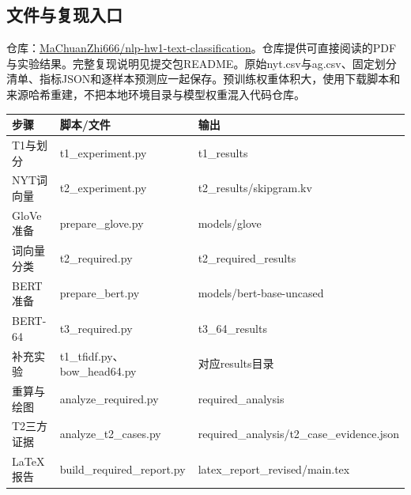 \documentclass[UTF8,a4paper,11pt,fontset=fandol]{ctexart}
\begin{document}
\subsection{文件与复现入口}
仓库：\href{https://github.com/MaChuanZhi666/nlp-hw1-text-classification}{MaChuanZhi666/\allowbreak{}nlp-hw1-text-classification}。仓库提供可直接阅读的PDF与实验结果。完整复现说明见提交包README。原始nyt.\allowbreak{}csv与ag.\allowbreak{}csv、固定划分清单、指标JSON和逐样本预测应一起保存。预训练权重体积大，使用下载脚本和来源哈希重建，不把本地环境目录与模型权重混入代码仓库。

\begin{center}\begin{minipage}{\linewidth}\small
\setlength{\tabcolsep}{4pt}
\renewcommand{\arraystretch}{1.22}
\begin{tabular}{>{\raggedright\arraybackslash}p{}>{\raggedright\arraybackslash}p{}>{\raggedright\arraybackslash}p{}}
\toprule
\textbf{步骤} & \textbf{脚本/\allowbreak{}文件} & \textbf{输出} \\
\midrule
T1与划分 & t1\_\allowbreak{}experiment.\allowbreak{}py & t1\_\allowbreak{}results \\
NYT词向量 & t2\_\allowbreak{}experiment.\allowbreak{}py & t2\_\allowbreak{}results/\allowbreak{}skipgram.\allowbreak{}kv \\
GloVe准备 & prepare\_\allowbreak{}glove.\allowbreak{}py & models/\allowbreak{}glove \\
词向量分类 & t2\_\allowbreak{}required.\allowbreak{}py & t2\_\allowbreak{}required\_\allowbreak{}results \\
BERT准备 & prepare\_\allowbreak{}bert.\allowbreak{}py & models/\allowbreak{}bert-base-uncased \\
BERT-64 & t3\_\allowbreak{}required.\allowbreak{}py & t3\_\allowbreak{}64\_\allowbreak{}results \\
补充实验 & t1\_\allowbreak{}tfidf.\allowbreak{}py、bow\_\allowbreak{}head64.\allowbreak{}py & 对应results目录 \\
重算与绘图 & analyze\_\allowbreak{}required.\allowbreak{}py & required\_\allowbreak{}analysis \\
T2三方证据 & analyze\_\allowbreak{}t2\_\allowbreak{}cases.\allowbreak{}py & required\_\allowbreak{}analysis/\allowbreak{}t2\_\allowbreak{}case\_\allowbreak{}evidence.\allowbreak{}json \\
LaTeX报告 & build\_\allowbreak{}required\_\allowbreak{}report.\allowbreak{}py & latex\_\allowbreak{}report\_\allowbreak{}revised/\allowbreak{}main.\allowbreak{}tex \\
\bottomrule
\end{tabular}
\end{minipage}\end{center}
\end{document}
